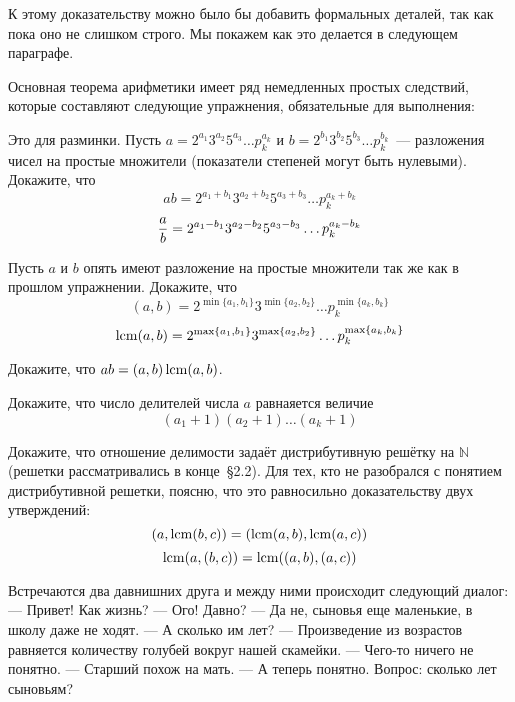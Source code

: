 К этому доказательству можно было бы добавить формальных деталей, так как пока оно не слишком строго. Мы покажем как это делается в следующем параграфе.

Основная теорема арифметики имеет ряд немедленных простых следствий, которые составляют следующие упражнения, обязательные для выполнения:

\begin{exercise}
Это для разминки. Пусть $a = 2^{a_1}3^{a_2}5^{a_3}\ldots p_k^{a_k}$ и $b = 2^{b_1}3^{b_2}5^{b_3}\ldots p_k^{b_k}$~--- разложения чисел на простые множители (показатели степеней могут быть нулевыми). Докажите, что
$$ab = 2^{a_1+b_1}3^{a_2+b_2}5^{a_3+b_3}\ldots p_k^{a_k+b_k}$$
$${a\over b} = 2^{a_1-b_1}3^{a_2-b_2}5^{a_3-b_3}\ldots p_k^{a_k-b_k}$$
\end{exercise}

\begin{exercise}
Пусть $a$ и $b$ опять имеют разложение на простые множители так же как в прошлом упражнении. Докажите, что
$$(a, b) = 2^{\min\{a_1, b_1\}} 3^{\min\{a_2, b_2\}}\ldots p_k^{\min\{a_k, b_k\}}$$
$$\operatorname{lcm}(a, b) = 2^{\max\{a_1, b_1\}} 3^{\max\{a_2, b_2\}}\ldots p_k^{\max\{a_k, b_k\}}$$
\end{exercise}

\begin{exercise}
Докажите, что $ab = (a, b) \operatorname{lcm}(a, b)$.
\end{exercise}

\begin{exercise}
Докажите, что число делителей числа $a$ равнаяется величие
$$(a_1 + 1)(a_2 + 1)\ldots(a_k + 1)$$
\end{exercise}

\begin{exercise}
Докажите, что отношение делимости задаёт дистрибутивную решётку на $\mathbb{N}$ (решетки рассматривались в конце~\S2.2). Для тех, кто не разобрался с понятием дистрибутивной решетки, поясню, что это равносильно доказательству двух утверждений:
$$(a, \operatorname{lcm}(b, c)) = (\operatorname{lcm}(a, b), \operatorname{lcm}(a, c))$$
$$\operatorname{lcm}(a, (b, c)) = \operatorname{lcm}((a, b), (a, c))$$
\end{exercise}

\begin{exercise}
Встречаются два давнишних друга и между ними происходит следующий диалог:
--- Привет! Как жизнь?
--- Ого! Давно?
--- Да не, сыновья еще маленькие, в школу даже не ходят.
--- А сколько им лет?
--- Произведение из возрастов равняется количеству голубей вокруг нашей скамейки.
--- Чего-то ничего не понятно.
--- Старший похож на мать.
--- А теперь понятно.
Вопрос: сколько лет сыновьям?
\end{exercise}

